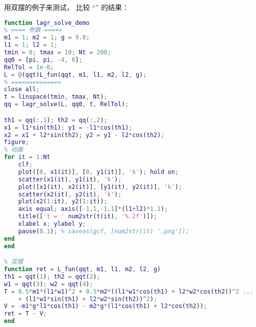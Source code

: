 用双摆的例子来测试， 比较 “” 的结果：
\begin{lstlisting}[language=matlab, caption=lagr\_solve\_demo.m]
% lagr_solve_demo
function lagr_solve_demo
% ==== 参数 =====
m1 = 1; m2 = 1; g = 9.8;
l1 = 1; l2 = 1;
tmin = 0; tmax = 10; Nt = 200;
qq0 = [pi, pi, -4, 6];
RelTol = 1e-6;
L = @(qqt)L_fun(qqt, m1, l1, m2, l2, g);
% ==============
close all;
t = linspace(tmin, tmax, Nt);
qq = lagr_solve(L, qq0, t, RelTol);

th1 = qq(:,1); th2 = qq(:,2);
x1 = l1*sin(th1); y1 = -l1*cos(th1);
x2 = x1 + l2*sin(th2); y2 = y1 - l2*cos(th2);
figure;
% 动画
for it = 1:Nt
    clf;
    plot([0, x1(it)], [0, y1(it)], 'k'); hold on;
    scatter(x1(it), y1(it), 'k');
    plot([x1(it), x2(it)], [y1(it), y2(it)], 'k');
    scatter(x2(it), y2(it), 'k');
    plot(x2(1:it), y2(1:it));
    axis equal; axis([-1,1,-1,1]*(l1+l2)*1.1);
    title(['t = ' num2str(t(it), '%.2f')]);
    xlabel x; ylabel y;
    pause(0.1); % saveas(gcf, [num2str(it) '.png']);
end
end

% 双摆
function ret = L_fun(qqt, m1, l1, m2, l2, g)
th1 = qqt(1); th2 = qqt(2);
w1 = qqt(3); w2 = qqt(4);
T = 0.5*m1*(l1*w1)^2 + 0.5*m2*((l1*w1*cos(th1) + l2*w2*cos(th2))^2 ...
    + (l1*w1*sin(th1) + l2*w2*sin(th2))^2);
V = -m1*g*l1*cos(th1) - m2*g*(l1*cos(th1) + l2*cos(th2));
ret = T - V;
end
\end{lstlisting}
